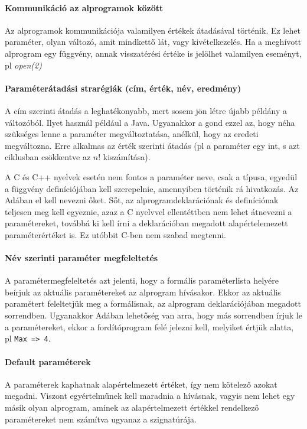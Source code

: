 \documentclass[fleqn,10pt,a4paper]{article}
\newcommand{\ut}[1]{\texttt{#1}}
\theoremstyle{magyar}
\begin{document}
  \paragraph{Kommunikáció az alprogramok között}
  Az alprogramok kommunikációja valamilyen értékek átadásával
  történik. Ez lehet paraméter, olyan változó, amit mindkettő lát,
  vagy kivételkezelés. Ha a meghívott alprogram egy függvény, annak
  visszatérési értéke is jelölhet valamilyen eseményt, pl
  \emph{open(2)}
  \paragraph[Paraméterátadási strarégiák]{Paraméterátadási strarégiák
    (cím, érték, név, eredmény)}
  A cím szerinti átadás a leghatékonyabb, mert sosem jön létre újabb
  példány a változóból. Ilyet használ például a Java. Ugyanakkor a
  gond ezzel az, hogy néha szükséges lenne a paraméter
  megváltoztatása, anélkül, hogy az eredeti megváltozna. Erre alkalmas
  az érték szerinti átadás (pl a paraméter egy int, s azt ciklusban
  csökkentve az $n!$ kiszámítása).

  A C és C++ nyelvek esetén nem fontos a paraméter neve, csak a
  típusa, egyedül a függvény definíciójában kell  szerepelnie,
  amennyiben történik rá hivatkozás. Az Adában el kell nevezni
  őket. Sőt, az alprogramdeklarációnak és definíciónak teljesen meg
  kell egyeznie, azaz a C nyelvvel ellentéttben nem lehet átnevezni a
  paramétereket, továbbá ki kell írni a deklarációban megadott
  alapértelemezett paraméterértéket is. Ez utóbbit C-ben nem szabad
  megtenni.
  
  \paragraph{Név szerinti paraméter megfeleltetés} A
  paramétermegfeleltetés azt jelenti, hogy a formális paraméterlista
  helyére beírjuk az aktuális paramétereket az alprogram
  hívásakor. Ekkor az aktuális paramétert feleltetjük meg a
  formálisnak, az alprogram deklarációjában megadott
  sorrendben. Ugyanakkor Adában lehetőség van arra, hogy más
  sorrendben írjuk le a paramétereket, ekkor a fordítóprogram felé
  jelezni kell, melyiket értjük alatta, pl \ut{Max => 4}.
  
  \paragraph{Default paraméterek}
  A paraméterek kaphatnak alapértelmezett értéket, így nem kötelező
  azokat megadni. Viszont egyértelműnek kell maradnia a hívásnak,
  vagyis nem lehet egy másik olyan alprogram, aminek az
  alapértelmezett értékkel rendelkező paramétereket nem számítva
  ugyanaz a szignatúrája.
\end{document}
